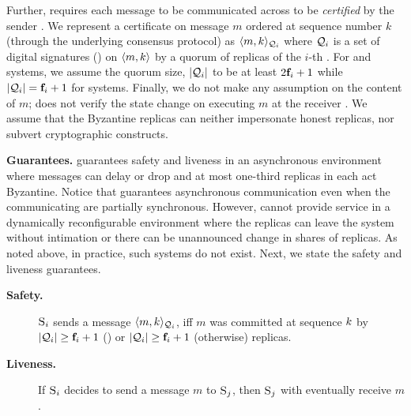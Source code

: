 Further, \Scrooge{} requires each message to be communicated across  to be 
{\em certified} by the sender \RSM{}.
We represent a certificate on message $m$ ordered at sequence number $k$ 
(through the underlying consensus protocol) as $\langle m, k\rangle_{\mathcal{Q}_{i}}$ where
$\mathcal{Q}_{i}$ is a set of digital signatures (\DS{}) on $\langle m, k \rangle$ by a quorum of replicas 
of the $i$-th \RSM{}.
For \BFT{} and \PoS{} systems, we assume the quorum size, $\lvert \mathcal{Q}_{i} \rvert$ to be at least $2\textbf{f}_{i}+1$ 
while $\lvert \mathcal{Q}_{i} \rvert = \textbf{f}_{i} + 1$ for \CFT{} systems.
Finally, we do not make any assumption on the content of $m$; 
\Scrooge{} does not verify the state change on executing $m$ at the receiver \RSM{}.
We assume that the Byzantine replicas can neither impersonate honest replicas, nor subvert cryptographic constructs.


{\bf Guarantees.} 
\Scrooge{} guarantees safety and liveness in an asynchronous environment where messages 
can delay or drop and at most one-third replicas in each \RSM{} act Byzantine.
Notice that \Scrooge{} guarantees asynchronous communication even when the communicating 
 are partially synchronous.
However, \Scrooge{} cannot provide service in a dynamically reconfigurable environment where 
the replicas can leave the system without intimation or there can be unannounced change in 
shares of replicas.
As noted above, in practice, such systems do not exist. 
Next, we state the safety and liveness guarantees.


\begin{description}
\item[\bf Safety.] 
\RSM{} $\textsc{S}_{i}$ sends a message $\langle m, k\rangle_{\mathcal{Q}_{i}}$, 
iff $m$ was committed at sequence $k$ by $\lvert \mathcal{Q}_{i} \rvert \ge \textbf{f}_{i}+1$ (\CFT{})
or $\lvert \mathcal{Q}_{i} \rvert \ge \textbf{f}_{i}+1$ (otherwise) replicas.

\item[\bf Liveness.]
If \RSM{} $\textsc{S}_{i}$ decides to send a message $m$ to \RSM{} $\textsc{S}_{j}$, 
then $\textsc{S}_{j}$ with eventually receive $m$.

\end{description}

%






